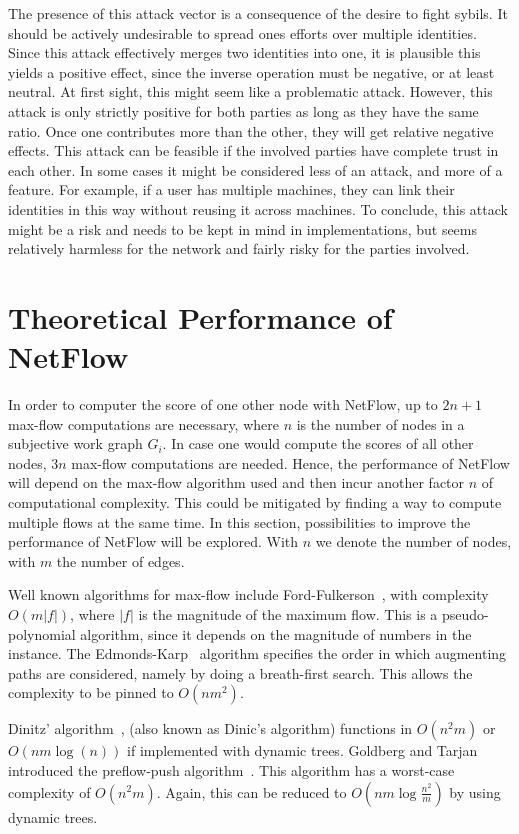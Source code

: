 \documentclass[a4paper,11pt]{book}
\theoremstyle{definition}
\begin{document}
The presence of this attack vector is a consequence of the desire to fight sybils. It should be
actively undesirable to spread ones efforts over multiple identities. Since this attack 
effectively merges two identities into one, it is plausible this yields a positive effect,
since the inverse operation must be negative, or at least neutral. At first sight, this
might seem like a problematic attack. However, this attack is only strictly positive for both parties as long
as they have the same ratio. Once one contributes more than the other, they will get relative negative
effects. This attack can be feasible if the involved parties have complete trust in each other. In some
cases it might be considered less of an attack, and more of a feature. For example, if a user
has multiple machines, they can link their identities in this way without reusing it across machines.
To conclude, this attack might be a risk and needs to be kept in mind in implementations, but seems relatively
harmless for the network and fairly risky for the parties involved.


\section{Theoretical Performance of NetFlow}

In order to computer the score of one other node with NetFlow, up to $2n+1$ max-flow
computations are necessary, where $n$ is the number of nodes in a subjective work graph $G_i$. 
In case one would compute
the scores of all other nodes, $3n$ max-flow computations are needed. Hence, the
performance of NetFlow will depend on the max-flow algorithm used and then incur
another factor $n$ of computational complexity. This could be mitigated by finding
a way to compute multiple flows at the same time. In this section, possibilities
to improve the performance of NetFlow will be explored. With $n$ we denote
the number of nodes, with $m$ the number of edges.

Well known algorithms for max-flow include Ford-Fulkerson~\cite{ford1956maximal},
with complexity $O(m|f|)$, where $|f|$ is the magnitude of the maximum flow. This
is a pseudo-polynomial algorithm, since it depends on the magnitude of numbers
in the instance.
The Edmonds-Karp~\cite{edmonds1972theoretical} algorithm specifies the order in which 
augmenting paths are considered, namely by doing a breath-first search. This allows
the complexity to be pinned to $O(nm^2)$.

Dinitz' algorithm~\cite{dinitz2006dinitz}, (also known as Dinic's algorithm) functions
in $O(n^2m)$ or $O(nm\log(n))$ if implemented with dynamic trees. Goldberg and Tarjan
introduced the preflow-push algorithm~\cite{goldberg1988new}. This algorithm
has a worst-case complexity of $O(n^2m)$. Again, this can be reduced to
$O(nm\log\frac{n^2}{m})$ by using dynamic trees.
\end{document}
